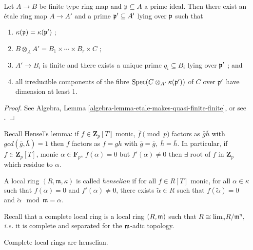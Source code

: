 \begin{theorem}
\label{theorem-quasi-finite-etale-locally}
Let $A\to B$ be finite type ring map and $\frak p \subseteq A$ a prime ideal. 
Then there exist an \'etale ring map $A \to A'$ and a prime $\frak p' \subseteq 
A'$ lying over $\frak p$ such that 
\begin{enumerate}
\item 
$\kappa(\frak p) = \kappa(\frak p')$ ;
\item 
$ B \otimes_A A' = B_1\times \cdots \times B_r \times C$ ;
\item 
$ A'\to B_i$ is finite and there exists a unique prime $q_i\subseteq B_i$ lying 
over $\frak p'$ ; and
\item 
all irreducible components of the fibre $\text{Spec}(C\otimes_{A'} \kappa(\frak 
p'))$ of $C$ over $\frak p'$ have dimension at least 1.
\end{enumerate}
\end{theorem}

\begin{proof}
See Algebra, Lemma \ref{algebra-lemma-etale-makes-quasi-finite-finite}, or
see \cite[Th\'eor\`eme 18.12.1]{EGA4}.
\end{proof}

\noindent
Recall Hensel's lemma: if $f\in \mathbf{Z}_p[T]$ monic, $\bar{f}\pmod{p}$
factors as  $\bar g\bar h$ with $gcd(\bar{g}, \bar{h})=1$ then $f$ factors
as $f = gh$ with  $\bar{g}=\bar{g}, \; \bar{h}=\bar{h}$. 
In particular, if $f \in \mathbf{Z}_p[T]$, monic
$\alpha\in \mathbf{F}_p$, $\bar f(\alpha) =0$  but $\bar f'(\alpha)\neq 0$
then $\exists $ root of $f$ in $\mathbf{Z}_p$ which  residue to $\alpha$. 


\begin{definition}
\label{definition-henselian}
A local ring $(R, \mathfrak m, \kappa)$ is called {\it henselian} if for all 
$f\in R[T]$ monic, for all $\alpha\in \kappa$ such that $\bar f(\alpha)=0$ and 
$\bar f'(\alpha)\neq 0$, there exists $\tilde\alpha\in R$ such that 
$f(\tilde\alpha) = 0$ and $\tilde\alpha\mod\mathfrak m = \alpha$. 
\end{definition} 

\noindent
Recall that a complete local ring is a local ring $(R, \frak m)$ such that  
$R\cong \text{lim}_n R/\mathfrak m^n$, {\it i.e.} it is complete and separated 
for the $\frak m$-adic topology.

\begin{theorem}
\label{theorem-hensel}
Complete local rings are henselian.
\end{theorem}

